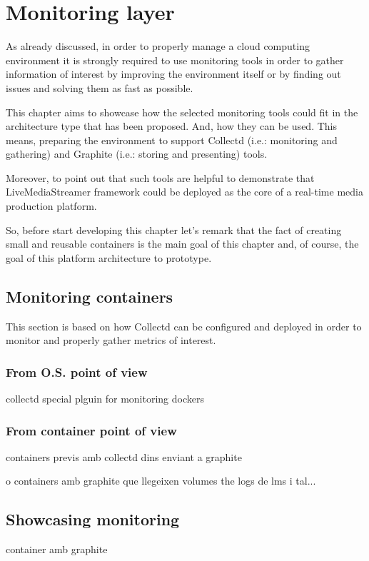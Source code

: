 \chapter{Monitoring layer}\label{G:monitoringLayer}

As already discussed, in order to properly manage a cloud computing environment it is strongly required to use monitoring tools in order to gather information of interest by improving the environment itself or by finding out issues and solving them as fast as possible.

This chapter aims to showcase how the selected monitoring tools could fit in the architecture type that has been proposed. And, how they can be used. This means, preparing the environment to support Collectd (i.e.: monitoring and gathering) and Graphite (i.e.: storing and presenting) tools.

Moreover, to point out that such tools are helpful to demonstrate that LiveMediaStreamer framework could be deployed as the core of a real-time media production platform.

So, before start developing this chapter let's remark that the fact of creating small and reusable containers is the main goal of this chapter and, of course, the goal of this platform architecture to prototype.

\section{Monitoring containers}

This section is based on how Collectd can be configured and deployed in order to monitor and properly gather metrics of interest.

\subsection{From O.S. point of view}
collectd special plguin for monitoring dockers

\subsection{From container point of view}

containers previs amb collectd dins enviant a graphite

o containers amb graphite que llegeixen volumes the logs de lms i tal...

\section{Showcasing monitoring}

container amb graphite